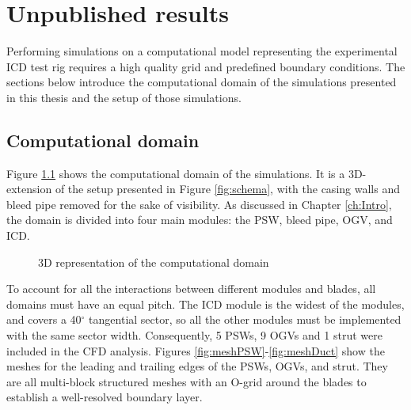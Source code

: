 %
\chapter{Unpublished results\label{ch:sim}}%
Performing simulations on a computational model representing the experimental ICD test rig requires a high quality grid and predefined boundary conditions. The sections below introduce the computational domain of the simulations presented in this thesis and the setup of those simulations.
%
\section{Computational domain}
Figure \ref{fig:rig} shows the computational domain of the simulations. It is a 3D-extension of the setup presented in Figure \ref{fig:schema}, with the casing walls and bleed pipe removed for the sake of visibility. As discussed in Chapter \ref{ch:Intro}, the domain is divided into four main modules: the PSW, bleed pipe, OGV, and ICD.
\begin{figure}[H]
  \centering
  \caption{3D representation of the computational domain}\label{fig:rig}
\end{figure}

To account for all the interactions between different modules and blades, all domains must have an equal pitch. The ICD module is the widest of the modules, and covers a 40$^{\circ}$ tangential sector, so all the other modules must be implemented with the same sector width. Consequently, 5 PSWs, 9 OGVs and 1 strut were included in the CFD analysis. Figures \ref{fig:meshPSW}-\ref{fig:meshDuct} show the meshes for the leading and trailing edges of the PSWs, OGVs, and strut. They are all multi-block structured meshes with an O-grid around the blades to establish a well-resolved boundary layer.

